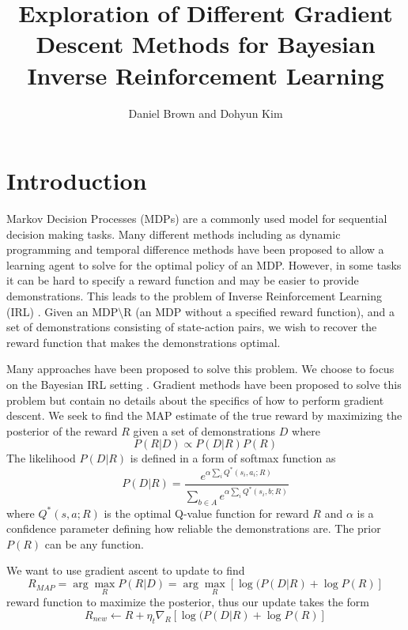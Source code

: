 \documentclass[10pt,a4paper]{article}
\author{Daniel Brown and Dohyun Kim}
\title{Exploration of Different Gradient Descent Methods for Bayesian Inverse Reinforcement Learning}
\begin{document}
\maketitle

\section{Introduction}
Markov Decision Processes (MDPs) are a commonly used model for sequential decision making tasks. Many different methods including as dynamic programming and temporal difference methods have been proposed to allow a learning agent to solve for the optimal policy of an MDP. However, in some tasks it can be hard to specify a reward function and may be easier to provide demonstrations. This leads to the problem of Inverse Reinforcement Learning (IRL) \cite{ng2000algorithms}. Given an MDP$\setminus$R (an MDP without a specified reward function), and a set of demonstrations consisting of state-action pairs, we wish to recover the reward function that makes the demonstrations optimal. 

Many approaches have been proposed to solve this problem. We choose to focus on the Bayesian IRL setting \cite{ramachandran2007bayesian}. Gradient methods have been proposed to solve this problem \cite{lopes2009active,choi2011map} but contain no details about the specifics of how to perform gradient descent. We seek to find the MAP estimate of the true reward by maximizing the posterior of the reward $R$ given a set of demonstrations $D$ where
\begin{equation}
P(R | D) \propto P(D | R) P(R)
\end{equation}
The likelihood $P(D|R)$ is defined in a form of softmax function \cite{sutton1998reinforcement} as 
\begin{equation}
P(D | R) = \frac{e^{\alpha \sum_i Q^*(s_i,a_i;R)}}{\sum_{b \in A} e^{\alpha \sum_i Q^*(s_i,b;R)}}
\end{equation}
where $Q^*(s,a; R)$ is the optimal Q-value function for reward $R$ and $\alpha$ is a confidence parameter defining how reliable the demonstrations are. The prior $P(R)$ can be any function. 

We want to use gradient ascent to update to find 
\begin{equation}
R_{MAP} = \arg \max_R  P(R | D) = \arg \max_R [\log(P(D|R) + \log P(R)]
\end{equation}
 reward function to maximize the posterior, thus our update takes the form
\begin{equation}
R_{new} \leftarrow R + \eta_t \nabla_R [\log(P(D|R) + \log P(R)]
\end{equation}
\end{document}

